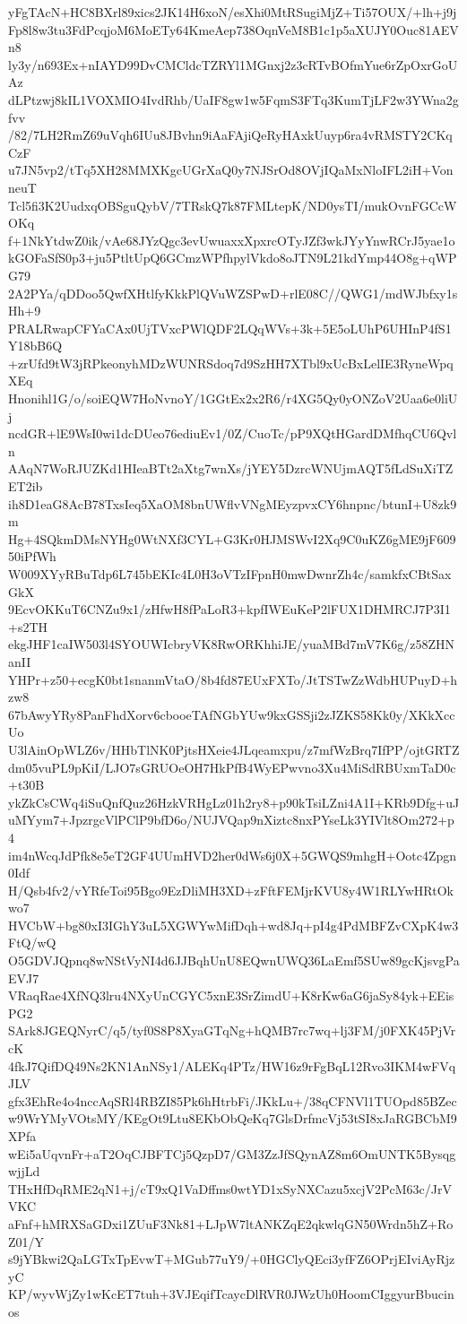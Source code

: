 yFgTAcN+HC8BXrl89xics2JK14H6xoN/esXhi0MtRSugiMjZ+Ti57OUX/+lh+j9j
Fp8l8w3tu3FdPcqjoM6MoETy64KmeAep738OqnVeM8B1c1p5aXUJY0Ouc81AEVn8
ly3y/n693Ex+nIAYD99DvCMCldcTZRYl1MGnxj2z3cRTvBOfmYue6rZpOxrGoUAz
dLPtzwj8kIL1VOXMIO4IvdRhb/UaIF8gw1w5FqmS3FTq3KumTjLF2w3YWna2gfvv
/82/7LH2RmZ69uVqh6IUu8JBvhn9iAaFAjiQeRyHAxkUuyp6ra4vRMSTY2CKqCzF
u7JN5vp2/tTq5XH28MMXKgcUGrXaQ0y7NJSrOd8OVjIQaMxNloIFL2iH+VonneuT
Tcl5fi3K2UudxqOBSguQybV/7TRskQ7k87FMLtepK/ND0ysTI/mukOvnFGCcWOKq
f+1NkYtdwZ0ik/vAe68JYzQgc3evUwuaxxXpxrcOTyJZf3wkJYyYnwRCrJ5yae1o
kGOFaSfS0p3+ju5PtltUpQ6GCmzWPfhpylVkdo8oJTN9L21kdYmp44O8g+qWPG79
2A2PYa/qDDoo5QwfXHtlfyKkkPlQVuWZSPwD+rlE08C//QWG1/mdWJbfxy1sHh+9
PRALRwapCFYaCAx0UjTVxcPWlQDF2LQqWVs+3k+5E5oLUhP6UHInP4fS1Y18bB6Q
+zrUfd9tW3jRPkeonyhMDzWUNRSdoq7d9SzHH7XTbl9xUcBxLelIE3RyneWpqXEq
Hnonihl1G/o/soiEQW7HoNvnoY/1GGtEx2x2R6/r4XG5Qy0yONZoV2Uaa6e0liUj
ncdGR+lE9WsI0wi1dcDUeo76ediuEv1/0Z/CuoTc/pP9XQtHGardDMfhqCU6Qvln
AAqN7WoRJUZKd1HIeaBTt2aXtg7wnXs/jYEY5DzrcWNUjmAQT5fLdSuXiTZET2ib
ih8D1eaG8AcB78TxsIeq5XaOM8bnUWflvVNgMEyzpvxCY6hnpnc/btunI+U8zk9m
Hg+4SQkmDMsNYHg0WtNXf3CYL+G3Kr0HJMSWvI2Xq9C0uKZ6gME9jF60950iPfWh
W009XYyRBuTdp6L745bEKIc4L0H3oVTzIFpnH0mwDwnrZh4c/samkfxCBtSaxGkX
9EcvOKKuT6CNZu9x1/zHfwH8fPaLoR3+kpfIWEuKeP2lFUX1DHMRCJ7P3I1+s2TH
ekgJHF1caIW503l4SYOUWIcbryVK8RwORKhhiJE/yuaMBd7mV7K6g/z58ZHNanII
YHPr+z50+ecgK0bt1snanmVtaO/8b4fd87EUxFXTo/JtTSTwZzWdbHUPuyD+hzw8
67bAwyYRy8PanFhdXorv6cbooeTAfNGbYUw9kxGSSji2zJZKS58Kk0y/XKkXccUo
U3lAinOpWLZ6v/HHbTlNK0PjtsHXeie4JLqeamxpu/z7mfWzBrq7IfPP/ojtGRTZ
dm05vuPL9pKiI/LJO7sGRUOeOH7HkPfB4WyEPwvno3Xu4MiSdRBUxmTaD0c+t30B
ykZkCsCWq4iSuQnfQuz26HzkVRHgLz01h2ry8+p90kTsiLZni4A1I+KRb9Dfg+uJ
uMYym7+JpzrgcVlPClP9bfD6o/NUJVQap9nXiztc8nxPYseLk3YIVlt8Om272+p4
im4nWcqJdPfk8e5eT2GF4UUmHVD2her0dWs6j0X+5GWQS9mhgH+Ootc4Zpgn0Idf
H/Qsb4fv2/vYRfeToi95Bgo9EzDliMH3XD+zFftFEMjrKVU8y4W1RLYwHRtOkwo7
HVCbW+bg80xI3IGhY3uL5XGWYwMifDqh+wd8Jq+pI4g4PdMBFZvCXpK4w3FtQ/wQ
O5GDVJQpnq8wNStVyNI4d6JJBqhUnU8EQwnUWQ36LaEmf5SUw89gcKjsvgPaEVJ7
VRaqRae4XfNQ3lru4NXyUnCGYC5xnE3SrZimdU+K8rKw6aG6jaSy84yk+EEisPG2
SArk8JGEQNyrC/q5/tyf0S8P8XyaGTqNg+hQMB7rc7wq+lj3FM/j0FXK45PjVrcK
4fkJ7QifDQ49Ns2KN1AnNSy1/ALEKq4PTz/HW16z9rFgBqL12Rvo3IKM4wFVqJLV
gfx3EhRe4o4nccAqSRl4RBZI85Pk6hHtrbFi/JKkLu+/38qCFNVl1TUOpd85BZec
w9WrYMyVOtsMY/KEgOt9Ltu8EKbObQeKq7GlsDrfmcVj53tSI8xJaRGBCbM9XPfa
wEi5aUqvnFr+aT2OqCJBFTCj5QzpD7/GM3ZzJfSQynAZ8m6OmUNTK5BysqgwjjLd
THxHfDqRME2qN1+j/cT9xQ1VaDffms0wtYD1xSyNXCazu5xcjV2PcM63c/JrVVKC
aFnf+hMRXSaGDxi1ZUuF3Nk81+LJpW7ltANKZqE2qkwlqGN50Wrdn5hZ+RoZ01/Y
s9jYBkwi2QaLGTxTpEvwT+MGub77uY9/+0HGClyQEci3yfFZ6OPrjEIviAyRjzyC
KP/wyvWjZy1wKcET7tuh+3VJEqifTcaycDlRVR0JWzUh0HoomCIggyurBbucinos
